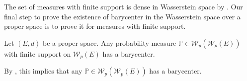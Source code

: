 The set of measures with finite support is dense in Wasserstein space by .
Our final step to prove the existence of barycenter in the Wasserstein space over a proper space
is to prove it for measures with finite support.

\begin{thm}
	\label{thm:barycenter_finite_support_measure}
	Let $(E,d)$ be a proper space.
	Any probability measure $\mathbb{P} \in \mathcal{W}_p(\mathcal{W}_p(E))$ with finite support on $\mathcal{W}_p(E)$
	has a barycenter.

	By , this implies that
	any $\mathbb{P} \in \mathcal{W}_p(\mathcal{W}_p(E))$ has a barycenter.
\end{thm}

